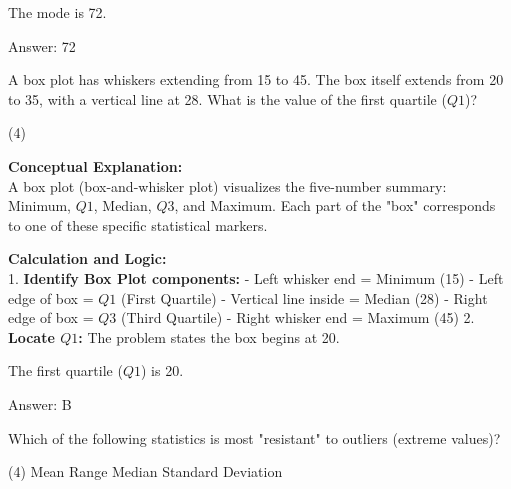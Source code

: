 \documentclass[11pt,paper=a4,answers]{exam}
\begin{document}
\begin{questions}
\begin{solution}
\vspace{20pt}

The mode is 72.

\vspace{30pt}

Answer: \colorbox{yellow!100}{72}
\end{solution}

\vspace{60pt}

\question
A box plot has whiskers extending from 15 to 45. The box itself extends from 20 to 35, with a vertical line at 28. What is the value of the first quartile ($Q1$)?
\begin{tasks}(4)
\end{tasks}

\begin{solution}
\textbf{Conceptual Explanation:} \\
A box plot (box-and-whisker plot) visualizes the five-number summary: Minimum, $Q1$, Median, $Q3$, and Maximum. Each part of the "box" corresponds to one of these specific statistical markers.

\vspace{30pt}

\textbf{Calculation and Logic:} \\
1. \textbf{Identify Box Plot components:} 
   - Left whisker end = Minimum (15)
   - Left edge of box = $Q1$ (First Quartile)
   - Vertical line inside = Median (28)
   - Right edge of box = $Q3$ (Third Quartile)
   - Right whisker end = Maximum (45)
2. \textbf{Locate $Q1$:} The problem states the box begins at 20.

\vspace{20pt}

The first quartile ($Q1$) is 20.

\vspace{30pt}

Answer: \colorbox{yellow!100}{B}
\end{solution}

\vspace{60pt}

\question
Which of the following statistics is most "resistant" to outliers (extreme values)?
\begin{tasks}(4)
    \task Mean
    \task Range
    \task Median
    \task Standard Deviation
\end{tasks}


\end{questions}
\end{document}
